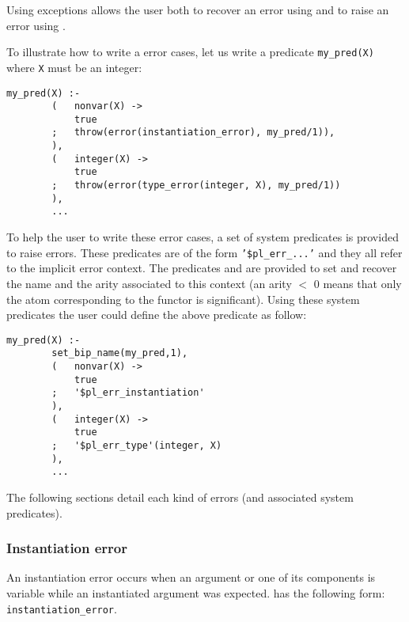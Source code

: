 Using exceptions allows the user both to recover an error using
  and to raise an error using
 . 

To illustrate how to write a error cases, let us write a predicate
\texttt{my\_pred(X)} where \texttt{X} must be an integer:

\begin{Indentation}
\begin{verbatim}
my_pred(X) :-
        (   nonvar(X) ->
            true
        ;   throw(error(instantiation_error), my_pred/1)),
        ),
        (   integer(X) ->
            true
        ;   throw(error(type_error(integer, X), my_pred/1))
        ),
        ...
\end{verbatim}
\end{Indentation}

To help the user to write these error cases, a set of system predicates is
provided to raise errors. These predicates are of the form
\texttt{'\$pl\_err\_...'} and they all refer to the implicit error context.
The predicates   and
  are provided to
set and recover the name and the arity associated to this context (an arity
$<$ 0 means that only the atom corresponding to the functor is significant).
Using these system predicates the user could define the above predicate as
follow:

\begin{Indentation}
\begin{verbatim}
my_pred(X) :-
        set_bip_name(my_pred,1),
        (   nonvar(X) ->
            true
        ;   '$pl_err_instantiation'
        ),
        (   integer(X) ->
            true
        ;   '$pl_err_type'(integer, X)
        ),
        ...
\end{verbatim}
\end{Indentation}

The following sections detail each kind of errors (and associated system
predicates).

\subsubsection{Instantiation error}
\label{Instantiation-error}
An instantiation error occurs when an argument or one of its components is
variable while an instantiated argument was expected.
 has the following form:
\texttt{instantiation\_error}.

